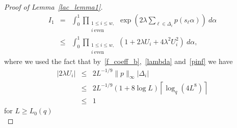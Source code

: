 \documentclass[12pt]{amsart}
\begin{document}
\begin{proof}[Proof of Lemma~\ref{lac_lemma1}]
\begin{eqnarray}
I_1 & = & \int_0^1 \prod_{\substack{1 \leq i \leq w,\\ i ~\textrm{even}}} \exp \left( 2 \lambda \sum_{\ell \in \Delta_i} p(s_\ell \alpha) \right) ~d\alpha \nonumber\\
& \leq & \int_0^1 \prod_{\substack{1 \leq i \leq w,\\ i ~\textrm{even}}} \left( 1 + 2 \lambda U_i + 4 \lambda^2 U_i^2 \right) ~d\alpha, \label{i1alpha}
\end{eqnarray}
where we used the fact that by~\eqref{f_coeff_b},~\eqref{lambda} and~\eqref{pinf} we have
\begin{eqnarray*}
|2 \lambda U_i| & \leq & 2 L^{-1/9} \|p\|_\infty |\Delta_i| \\
& \leq & 2 L^{-1/9} (1 + 8 \log L) \left\lceil \log_q (4 L^8) \right\rceil\\
& \leq & 1
\end{eqnarray*}
for $L \geq L_0(q)$\\


\end{proof}
\end{document}
